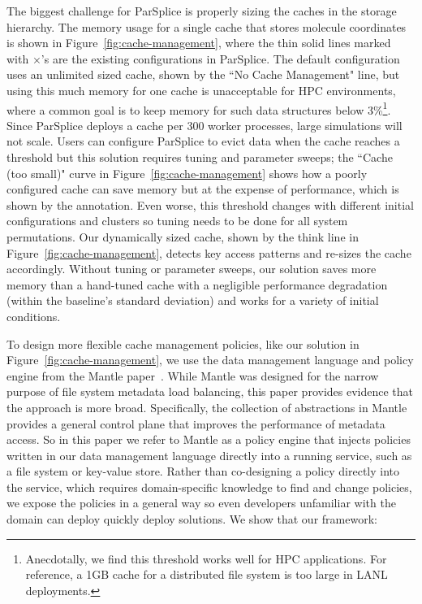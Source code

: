 The biggest challenge for ParSplice is properly sizing the caches in the
storage hierarchy.  The memory usage for a single cache that stores molecule
coordinates is shown in Figure~\ref{fig:cache-management}, where the thin solid
lines marked with \(\times\)'s are the existing configurations in ParSplice.
The default configuration uses an unlimited sized cache, shown by the ``No
Cache Management" line, but using this much memory for one cache is
unacceptable for HPC environments, where a common goal is to keep memory for
such data structures below 3\%\footnote{Anecdotally, we find this threshold
works well for HPC applications.  For reference, a 1GB cache for a distributed
file system is too large in LANL deployments.}. Since ParSplice deploys a cache
per 300 worker processes, large simulations will not scale.  Users can
configure ParSplice to evict data when the cache reaches a threshold but this
solution requires tuning and parameter sweeps; the ``Cache (too small)" curve
in Figure~\ref{fig:cache-management} shows how a poorly configured cache can
save memory but at the expense of performance, which is shown by the
annotation.  Even worse, this threshold changes with different initial
configurations and clusters so tuning needs to be done for all system
permutations.  Our dynamically sized cache, shown by the think line in
Figure~\ref{fig:cache-management}, detects key access patterns and re-sizes the
cache accordingly.  Without tuning or parameter sweeps, our solution saves more
memory than a hand-tuned cache with a negligible performance degradation
(within the baseline's standard deviation) and works for a variety of initial
conditions.

To design more flexible cache management policies, like our solution in
Figure~\ref{fig:cache-management}, we use the data management language and
policy engine from the Mantle paper~\cite{sevilla:sc15-mantle}.  While Mantle
was designed for the narrow purpose of file system metadata load balancing, this
paper provides evidence that the approach is more broad.  Specifically, the
collection of abstractions in Mantle provides a general control plane that
improves the performance of metadata access. So in this paper we refer to
Mantle as a policy engine that injects policies written in our data management
language directly into a running service, such as a file system or key-value
store.  Rather than co-designing a policy directly into the service, which
requires domain-specific knowledge to find and change policies, we expose the
policies in a general way so even developers unfamiliar with the domain can
deploy quickly deploy solutions.  We show that our framework:

